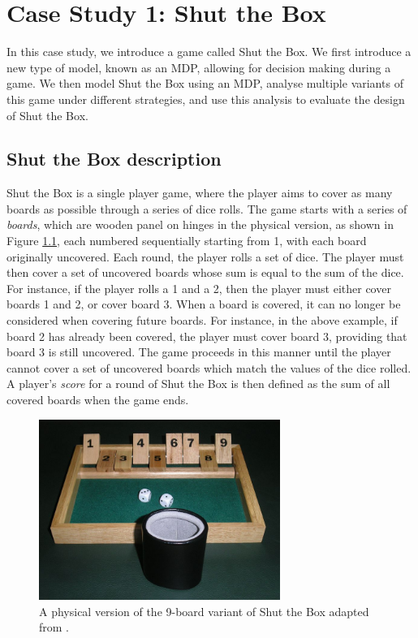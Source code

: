 \chapter{Case Study 1: Shut the Box}
\label{cs1}

In this case study, we introduce a game called Shut the Box. We first introduce a new type of model, known as an MDP, allowing for decision making during a game. We then model Shut the Box using an MDP, analyse multiple variants of this game under different strategies, and use this analysis to evaluate the design of Shut the Box.

\section{Shut the Box description}
\label{cs1:stb_description}

Shut the Box is a single player game, where the player aims to cover as many boards as possible through a series of dice rolls. The game starts with a series of \emph{boards}, which are wooden panel on hinges in the physical version, as shown in Figure \ref{cs1:physical_stb}, each numbered sequentially starting from 1, with each board originally uncovered. Each round, the player rolls a set of dice. The player must then cover a set of uncovered boards whose sum is equal to the sum of the dice. For instance, if the player rolls a 1 and a 2, then the player must either cover boards 1 and 2, or cover board 3. When a board is covered, it can no longer be considered when covering future boards. For instance, in the above example, if board 2 has already been covered, the player must cover  board 3, providing that board 3 is still uncovered. The game proceeds in this manner until the player cannot cover a set of uncovered boards which match the values of the dice rolled. A player's \emph{score} for a round of Shut the Box is then defined as the sum of all covered boards when the game ends.

\begin{figure}[h]
    \centering
    \includegraphics[width=0.7\textwidth]{images/shut_the_box.jpg}
    \caption{A physical version of the 9-board variant of Shut the Box adapted from \cite{wikipedia_deutsch_2006}.}
    \label{cs1:physical_stb}
\end{figure}

